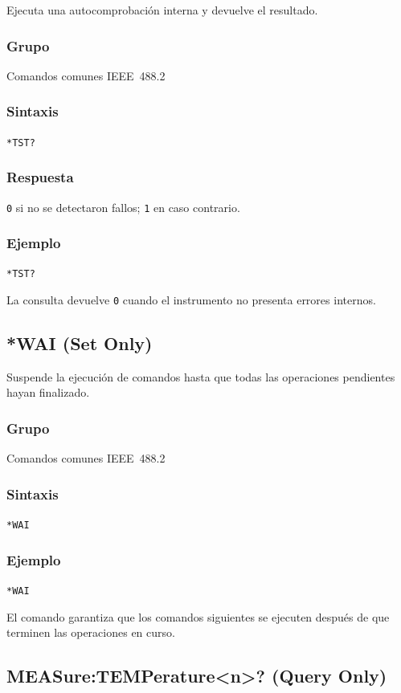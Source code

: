 Ejecuta una autocomprobación interna y devuelve el resultado.

\subsubsection*{Grupo}
Comandos comunes IEEE~488.2

\subsubsection*{Sintaxis}
\texttt{*TST?}

\subsubsection*{Respuesta}
\texttt{0} si no se detectaron fallos; \texttt{1} en caso contrario.

\subsubsection*{Ejemplo}
\texttt{*TST?}

La consulta devuelve \texttt{0} cuando el instrumento no presenta errores internos.

\subsection*{*WAI (Set Only)}

Suspende la ejecución de comandos hasta que todas las operaciones
pendientes hayan finalizado.

\subsubsection*{Grupo}
Comandos comunes IEEE~488.2

\subsubsection*{Sintaxis}
\texttt{*WAI}

\subsubsection*{Ejemplo}
\texttt{*WAI}

El comando garantiza que los comandos siguientes se ejecuten después de que terminen las operaciones en curso.

\subsection*{MEASure:TEMPerature<n>? (Query Only)}


